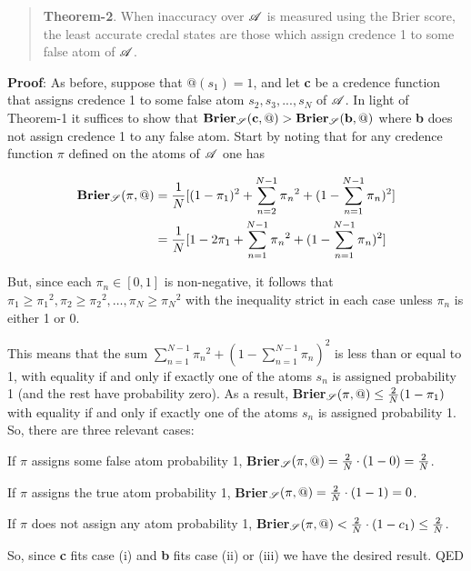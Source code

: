 \begin{quote}
\textbf{Theorem-2}. When inaccuracy over $\mathscr{A}$ is measured using the Brier score, the least accurate credal states are those which assign credence 1 to some false atom of $\mathscr{A}$.
\end{quote}
\textbf{Proof}: As before, suppose that $@(s_1) = 1$, and let \textbf{c} be a credence function that assigns credence 1 to some false atom $s_2, s_3,..., s_N$ of $\mathscr{A}$. In light of Theorem-1 it suffices to show that $\mathbf{Brier}_{\mathscr{S}}(\mathbf{c}, @) > \mathbf{Brier}_{\mathscr{S}}(\mathbf{b}, @)$ where \textbf{b} does not assign credence 1 to any false atom. Start by noting that for any credence function $\pi$ defined on the atoms of $\mathscr{A}$ one has

\begin{align*}
\mathbf{Brier}_{\mathscr{S}}(\pi,@) &= \frac{1}{N}[(1-\pi_1)^2 + \sum_{n=2}^{N-1}\pi{_n}^2+ (1-\sum_{n=1}^{N-1}\pi{_n})^2] \\
&= \frac{1}{N}[1 - 2\pi_1 + \sum_{n=1}^{N-1}\pi{_n}^2+ (1-\sum_{n=1}^{N-1}\pi{_n})^2]
\end{align*}

But, since each $\pi_n \in [0, 1]$ is non-negative, it follows that $\pi_1 \geq \pi{_1}^2, \pi_2 \geq \pi{_2}^2, \dots, \pi_N \geq \pi{_N}^2$ with the inequality strict in each case unless $\pi_n$ is either 1 or 0.

This means that the sum $\sum_{n=1}^{N-1}\pi{_n}^2+ (1-\sum_{n=1}^{N-1}\pi{_n})^2$ is less than or equal to 1, with equality if and only if exactly one of the atoms $s_n$ is assigned probability 1 (and the rest have probability zero). As a result, \textbf{Brier}$_{\mathscr{S}}(\pi, @) \leq \frac{2}{N}(1 - \pi_1)$ with equality if and only if exactly one of the atoms $s_n$ is assigned probability 1. So, there are three relevant cases:

\begin{enumerate*}
\renewcommand{\labelenumi}{(\roman{enumi})}
\item If $\pi$ assigns some false atom probability 1, \textbf{Brier}$_{\mathscr{S}}(\pi, @) = \frac{2}{N}\cdot(1 - 0) =  \frac{2}{N}$.
\item If $\pi$ assigns the true atom probability 1, \textbf{Brier}$_{\mathscr{S}}(\pi, @) = \frac{2}{N}\cdot(1 - 1) = 0$.
\item If $\pi$ does not assign any atom probability 1, \textbf{Brier}$_{\mathscr{S}}(\pi, @) < \frac{2}{N}\cdot(1 - c_1) \leq \frac{2}{N}$.
\end{enumerate*}
So, since \textbf{c} fits case (i) and \textbf{b} fits case (ii) or (iii) we have the desired result. QED

